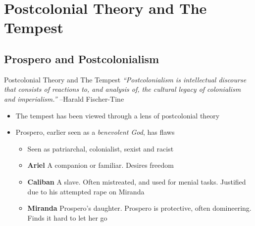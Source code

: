 \documentclass{beamer}
\begin{document}
\section{Postcolonial Theory and The Tempest}
\subsection{Prospero and Postcolonialism}
\begin{frame}{Postcolonial Theory and The Tempest}
  \emph{``Postcolonialism is intellectual discourse that consists of reactions to, and analysis of, the cultural legacy of colonialism and imperialism.''}
  --Harald Fischer-Tine
  \begin{itemize}
    \item The tempest has been viewed through a lens of postcolonial theory
    \item Prospero, earlier seen as a \emph{benevolent God}, has flaws
      \begin{itemize}
      \item Seen as patriarchal, colonialist, sexist and racist
      \item \textbf{Ariel} A companion or familiar. Desires freedom
      \item \textbf{Caliban} A slave. Often mistreated, and used for menial tasks. Justified due to his attempted rape on Miranda
      \item \textbf{Miranda} Prospero's daughter. Prospero is protective, often domineering. Finds it hard to let her go
      \end{itemize}
  \end{itemize}
  \end{frame}
\end{document}
